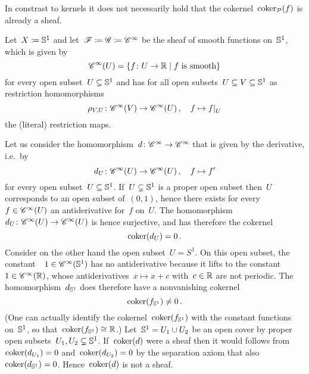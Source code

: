 \begin{example}
\begin{enumerate}
      In constrast to kernels it does not necessarily hold that the cokernel~$\operatorname{coker}_{\mathcal{P}}(f)$ is already a sheaf.
      
      \begin{examplenonum}
        Let~$X \coloneqq \mathbb{S}^1$ and let~$\mathscr{F} \coloneqq \mathscr{G} \coloneqq \mathscr{C}^\infty$ be the sheaf of smooth  functions on~$\mathbb{S}^1$, which is given by
        \[
            \Cs^\infty(U)
          = \{
              f \colon U \to \Real
            \suchthat
              \text{$f$ is smooth}
            \}
        \]
        for every open subset~$U \subseteq \mathbb{S}^1$ and has for all open subsets~$U \subseteq V \subseteq \mathbb{S}^1$ as restriction homomorphisms
        \[
                  \rho_{V,U}
          \colon  \Cs^\infty(V)
          \to     \Cs^\infty(U) \,,
          \quad   f
          \mapsto \restrict{f}{U}
        \]
        the (literal) restriction maps.

        Let us consider the homomorphism~$d \colon \mathscr{C}^\infty \to \mathscr{C}^\infty$ that is given by the derivative, i.e.\ by
        \[
                  d_U
          \colon  \mathscr{C}^\infty(U)
          \to     \mathscr{C}^\infty(U) \,,
          \quad   f
          \mapsto f'
        \]
        for every open subset~$U \subseteq \mathbb{S}^1$.
        If~$U \subsetneq \mathbb{S}^1$ is a proper open subset then~$U$ corresponds to an open subset of~$(0,1)$, hence there exists for every~$f \in \mathscr{C}^\infty(U)$ an antiderivative for~$f$ on~$U$.
        The homomorphism~$d_U \colon \mathscr{C}^\infty(U) \to \mathscr{C}^\infty(U)$ is hence surjective, and has therefore the cokernel
        \[
            \operatorname{coker}(d_U)
          = 0 \,.
        \]
        Consider on the other hand the open subset~$U = S^1$.
        On this open subset, the constant~~$1 \in \mathscr{C}^\infty(\mathbb{S}^1)$ has no antiderivative because it lifts to the constant~~$1 \in \mathscr{C}^\infty(\mathbb{R})$, whose antiderivatives~$x \mapsto x + c$ with~$c \in \mathbb{R}$ are not periodic.
        The homomorphism~$d_{\mathbb{S}^1}$ does therefore have a nonvanishing cokernel
        \[
                \operatorname{coker}(f_{\mathbb{S}^1})
          \neq  0 \,.
        \]
        (One can actually identify the cokernel~$\operatorname{coker}(f_{\mathbb{S}^1})$ with the constant functions on~$\mathbb{S}^1$, so that~$\operatorname{coker}(f_{\mathbb{S}^1}) \cong \mathbb{R}$.)
        Let~$\mathbb{S}^1 = U_1 \cup U_2$ be an open cover by proper open subsets~$U_1, U_2 \subsetneq \mathbb{S}^1$.
        If~$\operatorname{coker}(d)$ were a sheaf then it would follows from~$\operatorname{coker}(d_{U_1}) = 0$ and~$\operatorname{coker}(d_{U_2}) = 0$ by the separation axiom that also~$\operatorname{coker}(d_{\mathbb{S}^1}) = 0$.
        Hence~$\operatorname{coker}(d)$ is not a sheaf.
      \end{examplenonum}
      

\end{enumerate}
\end{example}
